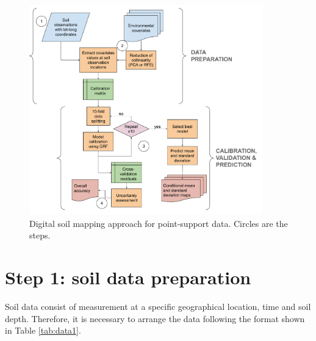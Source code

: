 \documentclass[
  10pt,
  b5paper,
  oneside]{book}
\begin{document}
\begin{figure}
  \centering
  \includegraphics[width=0.9\textwidth]{images/workflow lat-long data.pdf}
  \caption{Digital soil mapping approach for point-support data. Circles are the steps.}
  \label{fig:workflow1}
\end{figure}

\hypertarget{step-1-soil-data-preparation}{%
\chapter{Step 1: soil data preparation}\label{step-1-soil-data-preparation}}

Soil data consist of measurement at a specific geographical location, time and soil depth. Therefore, it is necessary to arrange the data following the format shown in Table \ref{tab:data1}.
\end{document}
